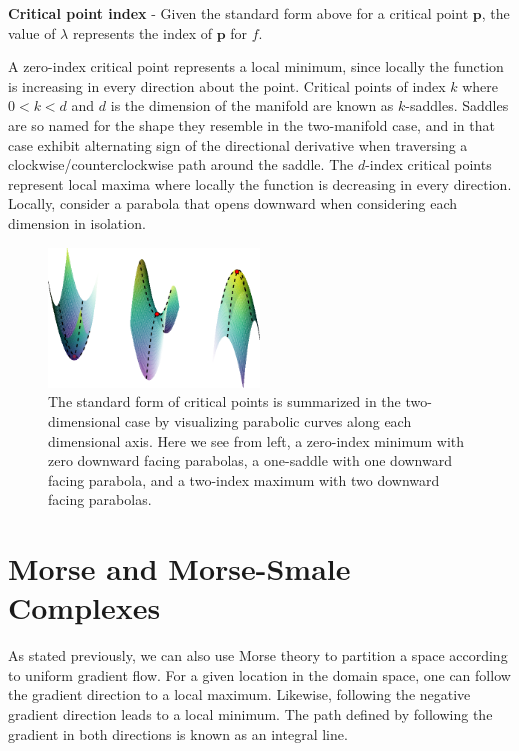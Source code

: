 \begin{defn}
\textbf{Critical point index} - Given the standard form above for a critical point $\mathbf{p}$, the value of $\lambda$ represents the index of $\mathbf{p}$ for $f$.
\end{defn}

A zero-index critical point represents a local minimum, since locally the function is increasing in every direction about the point. Critical points of index $k$ where $0 < k < d$ and $d$ is the dimension of the manifold are known as $k$-saddles.
%
Saddles are so named for the shape they resemble in the two-manifold case, and in that case exhibit alternating sign of the directional derivative when traversing a clockwise/counterclockwise path around the saddle.
%
The $d$-index critical points represent local maxima where locally the function is decreasing in every direction. Locally, consider a parabola that opens downward when considering each dimension in isolation.

\begin{figure}[b]
  \centering
  \includegraphics[width=0.5\textwidth]{figs/chap4/criticalPoints}
  \caption[Critical Points of Varying Index]{The standard form of critical points is summarized in the two-dimensional case by visualizing parabolic curves along each dimensional axis. Here we see from left, a zero-index minimum with zero downward facing parabolas, a one-saddle with one downward facing parabola, and a two-index maximum with two downward facing parabolas.}
  \label{fig:critical_points}
\end{figure}

\section{Morse and Morse-Smale Complexes}

As stated previously, we can also use Morse theory to partition a space according to uniform gradient flow.
%
For a given location in the domain space, one can follow the gradient direction to a local maximum.
%
Likewise, following the negative gradient direction leads to a local minimum.
%
The path defined by following the gradient in both directions is known as an integral line.

